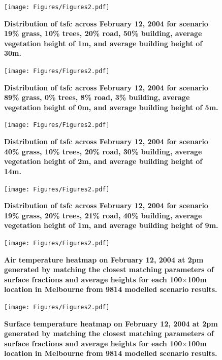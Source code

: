 \documentclass[final,3p,times,authoryear]{elsarticle}
\begin{document}
\begin{figure}
\centering
\texttt{[image: Figures/Figures2.pdf]}
\caption{\bf Distribution of \gls{tsfc} across February 12, 2004 for scenario 19\% grass, 10\% trees, 20\% road, 50\% building, average vegetation height of 1m, and average building height of 30m.}
 \label{fig:dist4}
\end{figure}


\begin{figure}
\centering
\texttt{[image: Figures/Figures2.pdf]}
\caption{\bf Distribution of \gls{tsfc} across February 12, 2004 for scenario 89\% grass, 0\% trees, 8\% road, 3\% building, average vegetation height of 0m, and average building height of 5m.}
 \label{fig:dist5}
\end{figure}


\begin{figure}
\centering
\texttt{[image: Figures/Figures2.pdf]}
\caption{\bf Distribution of \gls{tsfc} across February 12, 2004 for scenario 40\% grass, 10\% trees, 20\% road, 30\% building, average vegetation height of 2m, and average building height of 14m.}
 \label{fig:dist6}
\end{figure}

\begin{figure}
\centering
\texttt{[image: Figures/Figures2.pdf]}
\caption{\bf Distribution of \gls{tsfc} across February 12, 2004 for scenario 19\% grass, 20\% trees, 21\% road, 40\% building, average vegetation height of 1m, and average building height of 9m.}
 \label{fig:dist7}
\end{figure}


\begin{figure}
\centering
\texttt{[image: Figures/Figures2.pdf]}
\caption{\bf Air temperature heatmap on February 12, 2004 at 2pm generated by matching the closest matching parameters of surface fractions and average heights for each 100$\times$100m location in Melbourne from 9814 modelled scenario results.  }
 \label{fig:TaMelb}
\end{figure}

\begin{figure}
\centering
\texttt{[image: Figures/Figures2.pdf]}
\caption{\bf Surface temperature heatmap on February 12, 2004 at 2pm generated by matching the closest matching parameters of surface fractions and average heights for each 100$\times$100m location in Melbourne from 9814 modelled scenario results.  }
 \label{fig:TsfcMelb}
\end{figure}
\end{document}
